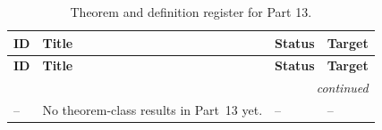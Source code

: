 \begingroup\scriptsize\setlength{\tabcolsep}{3pt}
\begin{longtable}{@{}p{}p{}p{}p{}@{}}
\caption{Theorem and definition register for Part 13.}\label{tab:p13-theorem-definition-register}\\
\toprule
\textbf{ID} & \textbf{Title} & \textbf{Status} & \textbf{Target} \\
\midrule
\endfirsthead
\toprule
\textbf{ID} & \textbf{Title} & \textbf{Status} & \textbf{Target} \\
\midrule
\endhead
\midrule\multicolumn{4}{r}{\emph{continued}}\\\endfoot
\bottomrule\endlastfoot
-- & No theorem-class results in Part~13 yet. & -- & -- \\
\end{longtable}
\endgroup
